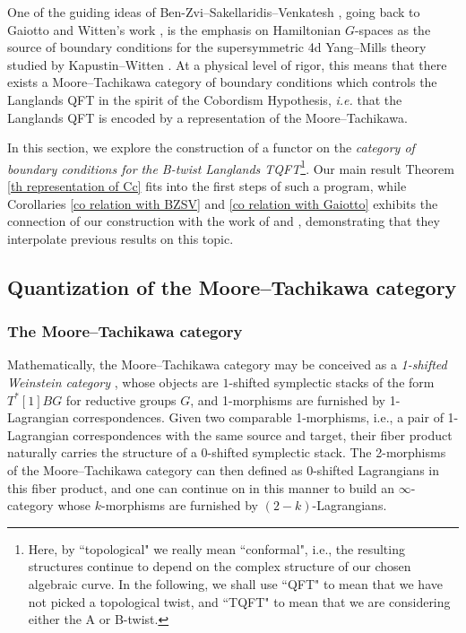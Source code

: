 \documentclass[11pt, a4paper]{amsart}
\numberwithin{equation}{section}
\theoremstyle{definition}
\theoremstyle{remark}
\begin{document}
One of the guiding ideas of Ben-Zvi--Sakellaridis--Venkatesh \cite{BZSV}, going back to Gaiotto and Witten's work \cite{gaiotto&witten, Gaiotto} , is the emphasis on Hamiltonian $G$-spaces as the source of boundary conditions for the supersymmetric 4d Yang–Mills theory studied by Kapustin--Witten \cite{kapustin&witten}.  At a physical level of rigor, this means that there exists a Moore--Tachikawa category of boundary conditions which controls the Langlands QFT in the spirit of the Cobordism Hypothesis, {\it i.e.} that the Langlands QFT is encoded by a representation of the Moore--Tachikawa.

In this section, we explore the construction of a functor on the \textit{category of boundary conditions for the B-twist Langlands TQFT}\footnote{Here, by ``topological" we really mean ``conformal", i.e., the resulting structures continue to depend on the complex structure of our chosen algebraic curve. In the following, we shall use ``QFT" to mean that we have not picked a topological twist, and ``TQFT" to mean that we are considering either the A or B-twist. }. Our main result Theorem \ref{th representation of Cc} fits into the first steps of such a program, while Corollaries \ref{co relation with BZSV} and \ref{co relation with Gaiotto} exhibits the connection of our construction with the work of \cite{BZSV} and \cite{Gaiotto}, demonstrating that they interpolate previous results on this topic. 

\subsection{Quantization of the Moore--Tachikawa category}


\subsubsection{The Moore--Tachikawa category}

Mathematically, the Moore--Tachikawa category \cite{Moore--Tachikawa} may be conceived as a \textit{1-shifted Weinstein category} \cite{Calaque, Crooks-Mayrand, Weinstein1, Weinstein2}, whose objects are $1$-shifted symplectic stacks of the form $T^*[1]BG$ for reductive groups $G$, and 1-morphisms are furnished by 1-Lagrangian correspondences. Given two comparable 1-morphisms, i.e., a pair of 1-Lagrangian correspondences with the same source and target, their fiber product naturally carries the structure of a 0-shifted symplectic stack. The 2-morphisms of the Moore--Tachikawa category can then defined as 0-shifted Lagrangians in this fiber product, and one can continue on in this manner to build an $\infty$-category whose $k$-morphisms are furnished by $(2-k)$-Lagrangians. 
\end{document}
